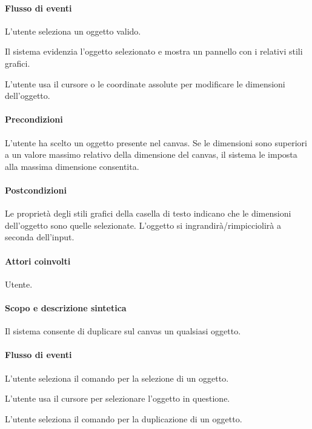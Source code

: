 \paragraph{Flusso di eventi}
\begin{elenconumerato}[\textbf{}]{\subsubsecindent}
\item  L'utente seleziona un oggetto valido.
\item  Il sistema evidenzia l'oggetto selezionato e mostra un pannello con i relativi stili grafici.
\item  L'utente usa il cursore o le coordinate assolute per modificare le dimensioni dell'oggetto.
\end{elenconumerato}
\paragraph{Precondizioni} L'utente ha scelto un oggetto presente nel canvas. Se le dimensioni sono superiori a un valore massimo relativo della dimensione del canvas, il sistema le imposta alla massima dimensione consentita.
\paragraph{Postcondizioni} Le propriet\`a  degli stili grafici della casella di testo indicano che le dimensioni dell'oggetto sono quelle selezionate. L'oggetto si ingrandir\` a/rimpicciolir\`a a seconda dell'input.

\paragraph{Attori coinvolti} Utente.
\paragraph{Scopo e descrizione sintetica} Il sistema consente di duplicare sul canvas un qualsiasi oggetto.
\paragraph{Flusso di eventi}
\begin{elenconumerato}[\textbf{}]{\subsubsecindent}
\item  L'utente seleziona il comando per la selezione di un oggetto.
\item  L'utente usa il cursore per selezionare l'oggetto in questione.
\item  L'utente seleziona il comando per la duplicazione di un oggetto.
\end{elenconumerato}
